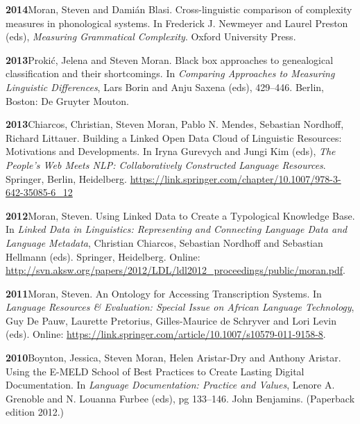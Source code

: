 \documentclass[11pt]{article}
\newcommand{\hangpara}{
 \setlength{\parindent}{0in} %
 \hangindent=0.42in %
}
\begin{document}
\vskip 6pt
\hangpara{\bf 2014}\hspace{1ex}Moran, Steven and Dami{\'a}n Blasi. Cross-linguistic comparison of complexity measures in phonological systems. In Frederick J. Newmeyer and Laurel Preston (eds), {\it Measuring Grammatical Complexity}. Oxford University Press. 

\vskip 6pt
\hangpara
{\bf 2013}\hspace{1ex}Proki{\'c}, Jelena and Steven Moran. Black box approaches to genealogical classification and their shortcomings. In {\it Comparing Approaches to Measuring Linguistic Differences}, Lars Borin and Anju Saxena (eds), 429--446. Berlin, Boston: De Gruyter Mouton.

\vskip 6pt
\hangpara
{\bf 2013}\hspace{1ex}Chiarcos, Christian, Steven Moran, Pablo N. Mendes, Sebastian Nordhoff, Richard Littauer. Building a Linked Open Data Cloud of Linguistic Resources: Motivations and Developments. In Iryna Gurevych and Jungi Kim (eds), {\it The People's Web Meets NLP: Collaboratively Constructed Language Resources}. Springer, Berlin, Heidelberg. \url{https://link.springer.com/chapter/10.1007/978-3-642-35085-6_12} %


\vskip 6pt
\hangpara
{\bf 2012}\hspace{1ex}Moran, Steven. Using Linked Data to Create a Typological Knowledge Base. In {\it Linked Data in Linguistics: Representing and Connecting Language Data and Language Metadata}, Christian Chiarcos, Sebastian Nordhoff and Sebastian Hellmann (eds). Springer, Heidelberg. Online: \url{http://svn.aksw.org/papers/2012/LDL/ldl2012_proceedings/public/moran.pdf}.

\vskip 6pt
\hangpara
{\bf 2011}\hspace{1ex}Moran, Steven. An Ontology for Accessing Transcription Systems. In {\it Language Resources \& Evaluation: Special Issue on African Language Technology}, Guy De Pauw, Laurette Pretorius, Gilles-Maurice de Schryver and Lori Levin (eds). Online: \url{https://link.springer.com/article/10.1007/s10579-011-9158-8}.%

\vskip 6pt
\hangpara
{\bf 2010}\hspace{1ex}Boynton, Jessica, Steven Moran, Helen Aristar-Dry and Anthony Aristar. Using the E-MELD School of Best Practices to Create Lasting Digital Documentation. In {\it Language Documentation: Practice and Values}, Lenore A. Grenoble and N. Louanna Furbee (eds), pg 133--146. John Benjamins. (Paperback edition 2012.)
\end{document}
